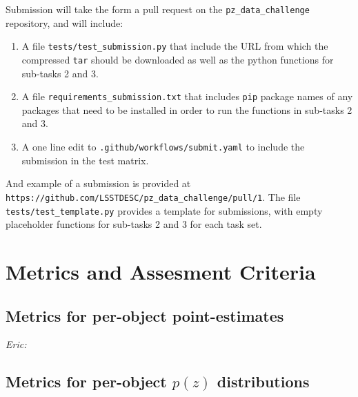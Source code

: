 \documentclass[modern]{desc-tex/styles/lsstdescnote}
\newcommand{\eac}[1]{{\em Eric:  }{\color{red}{#1}}}
\begin{document}
Submission will take the form a pull request on the
\texttt{pz\_data\_challenge} repository, and will include:

\begin{enumerate}
  \item{A file \texttt{tests/test\_{submission}.py} that include the
      URL from which the compressed \texttt{tar} should be downloaded
      as well as the python functions for sub-tasks 2 and 3.}
   \item{A file \texttt{requirements\_{submission}.txt} that includes
       \texttt{pip} package names of any packages that need to be
       installed in order to run the functions in sub-tasks 2 and 3.}
   \item{A one line edit to \texttt{.github/workflows/submit.yaml} to
       include the submission in the test matrix.}
\end{enumerate}

And example of a submission is provided at
\texttt{https://github.com/LSSTDESC/pz_data_challenge/pull/1}.
The file \texttt{tests/test\_template.py} provides a template for
submissions, with empty placeholder functions for sub-tasks 2 and 3
for each task set.







\section{Metrics and Assesment Criteria}


\subsection{Metrics for per-object point-estimates}

\eac{Bias, scatter and MAD}


\subsection{Metrics for per-object $p(z)$ distributions}
\end{document}
